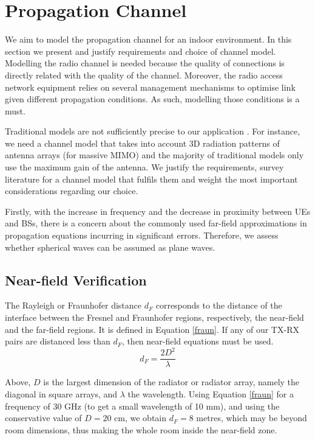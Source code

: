 \section{Propagation Channel}
\label{sec:radio_channel}

We aim to model the propagation channel for an indoor environment. In this section we present and justify requirements and choice of channel model. Modelling the radio channel is needed because the quality of connections is directly related with the quality of the channel. Moreover, the radio access network equipment relies on several management mechanisms to optimise link given different propagation conditions. As such, modelling those conditions is a must.

Traditional models are not sufficiently precise to our application \cite{1232163}. For instance, we need a channel model that takes into account 3D radiation patterns of antenna arrays (for massive MIMO) and the majority of traditional models only use the maximum gain of the antenna. We justify the requirements, survey literature for a channel model that fulfils them and weight the most important considerations regarding our choice.

Firstly, with the increase in frequency and the decrease in proximity between \acsp{UE} and \acsp{BS}, there is a concern about the commonly used far-field approximations in propagation equations incurring in significant errors. Therefore, we assess whether spherical waves can be assumed as plane waves.


\subsection*{Near-field Verification}
The Rayleigh or Fraunhofer distance $d_F$ corresponds to the distance of the interface between the Fresnel and Fraunhofer regions, respectively, the near-field and the far-field regions. It is defined in Equation \eqref{fraun}. If any of our TX-RX pairs are distanced less than $d_F$, then near-field equations must be used.
\begin{equation} \label{fraun}
    d_F = \frac{2 D^2}{\lambda}
\end{equation} 

Above, $D$ is the largest dimension of the radiator or radiator array, namely the diagonal in square arrays, and $\lambda$ the wavelength. Using Equation \ref{fraun} for a frequency of 30 GHz (to get a small wavelength of 10 mm), and using the conservative value of $D = 20 $ cm, we obtain $d_{F} = 8 $ metres, which may be beyond room dimensions, thus making the whole room inside the near-field zone. 


